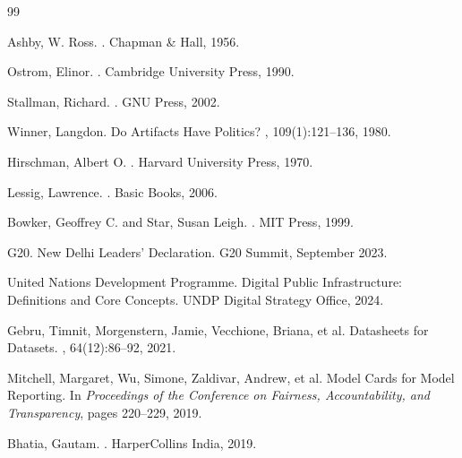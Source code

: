 \documentclass{article}
\begin{document}
\begin{thebibliography}{99}

Ashby, W. Ross.
.
\newblock Chapman \& Hall, 1956.

Ostrom, Elinor.
.
\newblock Cambridge University Press, 1990.

Stallman, Richard.
.
\newblock GNU Press, 2002.

Winner, Langdon.
\newblock Do Artifacts Have Politics?
, 109(1):121--136, 1980.

Hirschman, Albert O.
.
\newblock Harvard University Press, 1970.

Lessig, Lawrence.
.
\newblock Basic Books, 2006.

Bowker, Geoffrey C. and Star, Susan Leigh.
.
\newblock MIT Press, 1999.

G20.
\newblock New Delhi Leaders' Declaration.
\newblock G20 Summit, September 2023.

United Nations Development Programme.
\newblock Digital Public Infrastructure: Definitions and Core Concepts.
\newblock UNDP Digital Strategy Office, 2024.

Gebru, Timnit, Morgenstern, Jamie, Vecchione, Briana, et al.
\newblock Datasheets for Datasets.
, 64(12):86--92, 2021.

Mitchell, Margaret, Wu, Simone, Zaldivar, Andrew, et al.
\newblock Model Cards for Model Reporting.
\newblock In {\em Proceedings of the Conference on Fairness, Accountability, and Transparency}, pages 220--229, 2019.

Bhatia, Gautam.
.
\newblock HarperCollins India, 2019.


\end{thebibliography}
\end{document}
